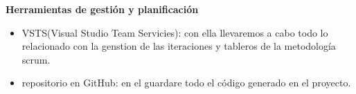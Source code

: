 \documentclass[a4paper]{article}
\begin{document}
\textbf{Herramientas de gestión y planificación}
\begin{itemize}
\item VSTS(Visual Studio Team Servicies): con ella llevaremos a cabo todo lo relacionado con la genstion de las iteraciones y tableros de la metodología scrum.
\item repositorio en GitHub: en el guardare todo el código generado en el proyecto.
\end{itemize}





\end{document}
